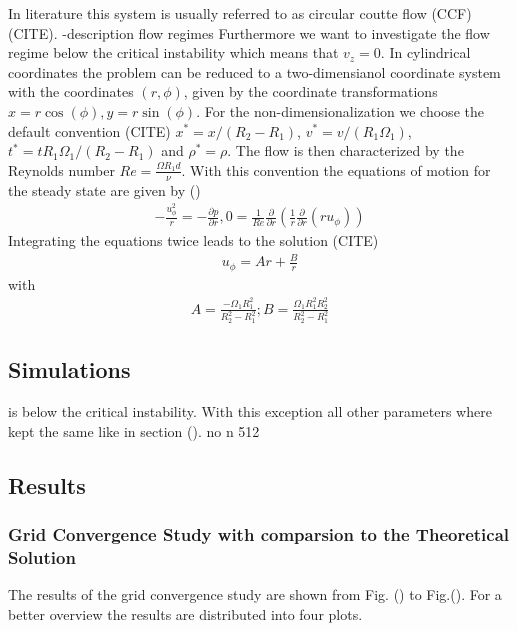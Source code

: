 In literature this system is usually referred to as circular coutte flow (CCF) (CITE).
-description flow regimes
Furthermore we want to investigate the flow regime
below the critical instability which means that $v_z=0$. In cylindrical coordinates the problem can be reduced to a two-dimensianol coordinate system with
the coordinates $(r, \phi)$, given by the coordinate transformations $x=r\cos(\phi), y = r\sin(\phi)$.
For the non-dimensionalization we choose the default convention (CITE) $x^*=x/(R_2 - R_1)$, $v^*=v/(R_1\Omega_1)$, $t^*=tR_1\Omega_1/(R_2-R_1)$ and $\rho^*=\rho$.
The flow is then characterized by the Reynolds number $Re = \frac{\Omega R_1d}{\nu}$. With this convention the equations of motion for the steady state are given by ()
\begin{align}
    -\frac{u^2_\phi}{r} = - \frac{\partial p}{\partial r}, 0 = \frac{1}{Re}\frac{\partial}{\partial r}\left(\frac{1}{r}\frac{\partial}{\partial r}(r u_\phi)\right)
\end{align}
Integrating the equations twice leads to the solution (CITE)
\begin{align}
    u_\phi = Ar + \frac{B}{r}
\end{align}
with
\begin{align}
    A = \frac{-\Omega_1R_1^2}{R^2_2 - R^2_1} ; B = \frac{\Omega_1R^2_1 R^2_2}{R^2_2 - R^2_1}
\end{align}

\subsection{Simulations}
is below the critical instability. With this exception all other parameters where kept the same like in section ().
\clearpage
no n 512

\subsection{Results}

\subsubsection{Grid Convergence Study with comparsion to the Theoretical Solution}

The results of the grid convergence study are shown from Fig. () to Fig.().
For a better overview the results are distributed into four plots.

